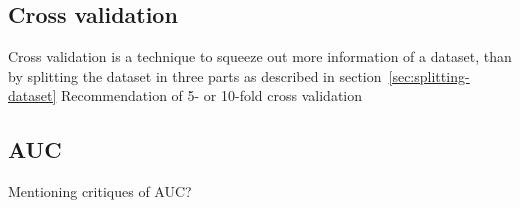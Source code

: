 \subsection{Cross validation}
Cross validation is a technique to squeeze out more information of a dataset, than by splitting the dataset in three parts as described in section~\ref{sec:splitting-dataset}
Recommendation of 5- or 10-fold cross validation \citep[p.243]{hastie09}
\subsection{AUC}\label{sec:theory:auc}
Mentioning critiques of AUC?

